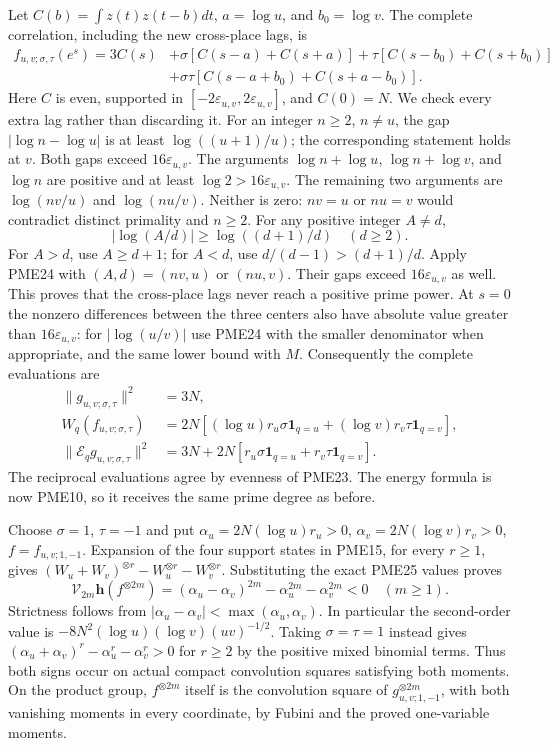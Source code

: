 \documentclass[11pt]{article}
\begin{document}
Let $C(b)=\int z(t)z(t-b)dt$, $a=\log u$, and $b_0=\log v$.
The complete correlation, including the new cross-place lags, is
\[
\begin{split}
 f_{u,v;\sigma,\tau}(e^s)=3C(s)
 &+\sigma[C(s-a)+C(s+a)]
 +\tau[C(s-b_0)+C(s+b_0)]\\
 &+\sigma\tau[C(s-a+b_0)+C(s+a-b_0)].
\end{split}
\tag{PME23}
\]
Here $C$ is even, supported in $[-2\varepsilon_{u,v},2\varepsilon_{u,v}]$,
and $C(0)=N$. We check every extra lag rather than discarding it.
For an integer $n\ge2$, $n\ne u$, the gap
$|\log n-\log u|$ is at least $\log((u+1)/u)$; the corresponding
statement holds at $v$. Both gaps exceed $16\varepsilon_{u,v}$.
The arguments $\log n+\log u$, $\log n+\log v$, and $\log n$
are positive and at least $\log2>16\varepsilon_{u,v}$.
The remaining two arguments are $\log(nv/u)$ and $\log(nu/v)$.
Neither is zero: $nv=u$ or $nu=v$ would contradict distinct
primality and $n\ge2$. For any positive integer $A\ne d$,
\[
 |\log(A/d)|\ge\log((d+1)/d)
 \quad(d\ge2).
 \tag{PME24}
\]
For $A>d$, use $A\ge d+1$; for $A<d$, use
$d/(d-1)>(d+1)/d$. Apply PME24 with $(A,d)=(nv,u)$ or $(nu,v)$.
Their gaps exceed $16\varepsilon_{u,v}$ as well. This proves that
the cross-place lags never reach a positive prime power.
At $s=0$ the nonzero differences between the three centers also
have absolute value greater than $16\varepsilon_{u,v}$:
for $|\log(u/v)|$ use PME24 with the smaller denominator when
appropriate, and the same lower bound with $M$.
Consequently the complete evaluations are
\[
\begin{split}
 \|g_{u,v;\sigma,\tau}\|^2&=3N,\\
 W_q(f_{u,v;\sigma,\tau})
   &=2N[(\log u)r_u\sigma\mathbf1_{q=u}
                  +(\log v)r_v\tau\mathbf1_{q=v}],\\
 \|\mathcal E_qg_{u,v;\sigma,\tau}\|^2
   &=3N+2N[r_u\sigma\mathbf1_{q=u}
                         +r_v\tau\mathbf1_{q=v}].
\end{split}
\tag{PME25}
\]
The reciprocal evaluations agree by evenness of PME23. The energy
formula is now PME10, so it receives the same prime degree as before.

Choose $\sigma=1$, $\tau=-1$ and put
$\alpha_u=2N(\log u)r_u>0$,
$\alpha_v=2N(\log v)r_v>0$, $f=f_{u,v;1,-1}$.
Expansion of the four support states in PME15, for every $r\ge1$,
gives $(W_u+W_v)^{\otimes r}-W_u^{\otimes r}-W_v^{\otimes r}$.
Substituting the exact PME25 values proves
\[
\boxed{
 \mathcal V_{2m}\mathbf h(f^{\otimes 2m})
  =(\alpha_u-\alpha_v)^{2m}-\alpha_u^{2m}-\alpha_v^{2m}<0
  \quad(m\ge1).}
\tag{PME26}
\]
Strictness follows from
$|\alpha_u-\alpha_v|<\max(\alpha_u,\alpha_v)$.
In particular the second-order value is
$-8N^2(\log u)(\log v)(uv)^{-1/2}$.
Taking $\sigma=\tau=1$ instead gives
$(\alpha_u+\alpha_v)^r-\alpha_u^r-\alpha_v^r>0$ for $r\ge2$
by the positive mixed binomial terms. Thus both signs occur on
actual compact convolution squares satisfying both moments.
On the product group, $f^{\otimes 2m}$ itself is the convolution
square of $g_{u,v;1,-1}^{\otimes 2m}$, with both vanishing moments
in every coordinate, by Fubini and the proved one-variable moments.
\end{document}

